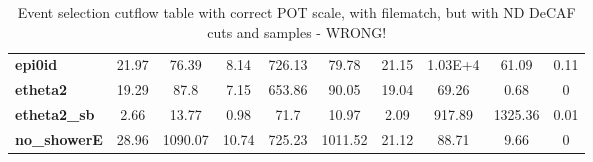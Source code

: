 \begin{table}[!hb]
\begin{tabular}{|l|ccc|ccc|ccc|}
\textbf{epi0id}       & 21.97             & 76.39                                                              & 8.14                                      & 726.13             & 79.78                                                               & 21.15                                      & 1.03E+4             & 61.09                                                               & 0.11                                       \\
\rowcolor[HTML]{67FD9A}
\textbf{etheta2}      & 19.29             & 87.8                                                               & 7.15                                      & 653.86             & 90.05                                                               & 19.04                                      & 69.26             & 0.68                                                                & 0                                          \\
\textbf{etheta2\_sb}  & 2.66              & 13.77                                                              & 0.98                                      & 71.7               & 10.97                                                               & 2.09                                       & 917.89            & 1325.36                                                             & 0.01                                       \\\hline\hline
\textbf{no\_showerE}  & 28.96             & 1090.07                                                            & 10.74                                    & 725.23             & 1011.52                                                             & 21.12                                      & 88.71             & 9.66                                                                & 0   \\\hline
\end{tabular}
\caption{Event selection cutflow table with correct POT scale, with filematch, but with ND DeCAF cuts and samples - WRONG!}
\label{tab:CutflowTableSignal}
\end{table}

